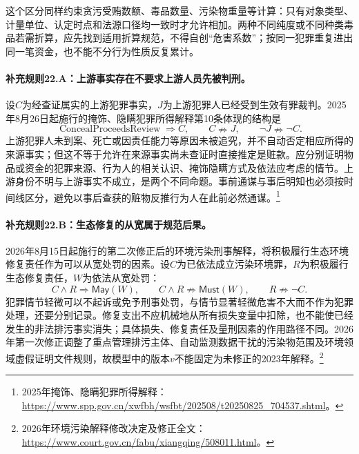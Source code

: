 这个区分同样约束贪污受贿数额、毒品数量、污染物重量等计算：只有对象类型、计量单位、认定时点和法源口径均一致时才允许相加。两种不同纯度或不同种类毒品若需折算，应先找到适用折算规范，不得自创“危害系数”；按同一犯罪重复进出同一笔资金，也不能不分行为性质反复累计。

\paragraph{补充规则22.A：上游事实存在不要求上游人员先被判刑。}
设$C$为经查证属实的上游犯罪事实，$J$为上游犯罪人已经受到生效有罪裁判。2025年8月26日起施行的掩饰、隐瞒犯罪所得解释第10条体现的结构是
\[
\operatorname{ConcealProceedsReview}\Rightarrow C,
\qquad C\nRightarrow J,
\qquad\neg J\nRightarrow\neg C.
\]
上游犯罪人未到案、死亡或因责任能力等原因未被追究，并不自动否定相应所得的来源事实；但这不等于允许在来源事实尚未查证时直接推定是赃款。应分别证明物品或资金的犯罪来源、行为人的相关认识、掩饰隐瞒方式及依法应考虑的情节。上游身份不明与上游事实不成立，是两个不同命题。事前通谋与事后明知也必须按时间线区分，避免以事后查获的赃物反推行为人在此前必然通谋。\footnote{2025年掩饰、隐瞒犯罪所得解释：\url{https://www.spp.gov.cn/xwfbh/wsfbt/202508/t20250825_704537.shtml}。}

\paragraph{补充规则22.B：生态修复的从宽属于规范后果。}
2026年8月15日起施行的第二次修正后的环境污染刑事解释，将积极履行生态环境修复责任作为可以从宽处罚的因素。设$C$为已依法成立污染环境罪，$R$为积极履行生态修复责任，$W$为依法从宽处罚：
\[
C\land R\Rightarrow\mathsf{May}(W),\qquad
C\land R\nRightarrow\mathsf{Must}(W),\qquad
R\nRightarrow\neg C.
\]
犯罪情节轻微可以不起诉或免予刑事处罚，与情节显著轻微危害不大而不作为犯罪处理，还要分别记录。修复支出不应机械地从所有损失变量中扣除，也不能使已经发生的非法排污事实消失；具体损失、修复责任及量刑因素的作用路径不同。2026年第一次修正调整了重点管理排污主体、自动监测数据干扰的污染物范围及环境领域虚假证明文件规则，故模型中的版本$v$不能固定为未修正的2023年解释。\footnote{2026年环境污染解释修改决定及修正全文：\url{https://www.court.gov.cn/fabu/xiangqing/508011.html}。}

